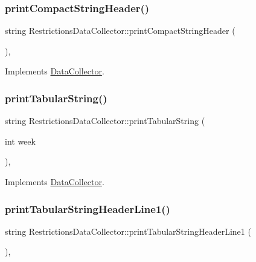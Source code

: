 \subsubsection{\texorpdfstring{print\+Compact\+String\+Header()}{printCompactStringHeader()}}
{\footnotesize\ttfamily string Restrictions\+Data\+Collector\+::print\+Compact\+String\+Header (\begin{DoxyParamCaption}{ }\end{DoxyParamCaption})\hspace{0.3cm}{\ttfamily [override]}, {\ttfamily [virtual]}}



Implements \mbox{\hyperlink{classDataCollector_a98dcb4ec871d9c7fbf7545c64e5ccc67}{Data\+Collector}}.

\mbox{\label{classRestrictionsDataCollector_a45e5612e70ec98430e31271f68ca407e}} 
\subsubsection{\texorpdfstring{print\+Tabular\+String()}{printTabularString()}}
{\footnotesize\ttfamily string Restrictions\+Data\+Collector\+::print\+Tabular\+String (\begin{DoxyParamCaption}\item[{int}]{week }\end{DoxyParamCaption})\hspace{0.3cm}{\ttfamily [override]}, {\ttfamily [virtual]}}



Implements \mbox{\hyperlink{classDataCollector_a397fccabe0223267eea8fc7cac0e59da}{Data\+Collector}}.

\mbox{\label{classRestrictionsDataCollector_a2676a6693b254997d223fc1c437258ab}} 
\subsubsection{\texorpdfstring{print\+Tabular\+String\+Header\+Line1()}{printTabularStringHeaderLine1()}}
{\footnotesize\ttfamily string Restrictions\+Data\+Collector\+::print\+Tabular\+String\+Header\+Line1 (\begin{DoxyParamCaption}{ }\end{DoxyParamCaption})\hspace{0.3cm}{\ttfamily [override]}, {\ttfamily [virtual]}}



